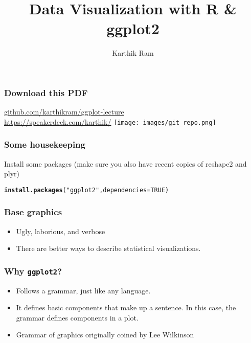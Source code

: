 \documentclass{beamer}\usepackage[]{graphicx}\usepackage[]{color}
\makeatletter
\newcommand{\hlstr}[1]{\textcolor[rgb]{0.192,0.494,0.8}{#1}}%
\newcommand{\hlkwd}[1]{\textcolor[rgb]{0.737,0.353,0.396}{\textbf{#1}}}%
\newenvironment{kframe}{%
 \def\at@end@of@kframe{}%
 \ifinner\ifhmode%
  \def\at@end@of@kframe{\end{minipage}}%
  \begin{minipage}{\columnwidth}%
 \fi\fi%
 \def\FrameCommand##1{\hskip\@totalleftmargin \hskip-\fboxsep
 \colorbox{shadecolor}{##1}\hskip-\fboxsep
     \hskip-\linewidth \hskip-\@totalleftmargin \hskip\columnwidth}%
 \MakeFramed {\advance\hsize-\width
   \@totalleftmargin\z@ \linewidth\hsize
   \@setminipage}}%
 {\par\unskip\endMakeFramed%
 \at@end@of@kframe}
\newenvironment{knitrout}{}{} %
\makeatother
\begin{document}


\title{Data Visualization with R \& ggplot2}
\author{Karthik Ram}
\maketitle

\begin{frame}[fragile]
\frametitle{Download this PDF}
\begingroup
    \fontsize{12pt}{12pt}\selectfont
\href{http://github.com/karthikram/ggplot-lecture}{github.com/karthikram/ggplot-lecture}\\
\href{https://speakerdeck.com/karthik/}{https://speakerdeck.com/karthik/}
\endgroup
\texttt{[image: images/git\_repo.png]}
\end{frame}

\begin{frame}[fragile]
\frametitle{Some housekeeping}
Install some packages (make sure you also have recent copies of reshape2 and plyr)
\begin{knitrout}\footnotesize
{}\color{fgcolor}\begin{kframe}
\begin{alltt}
\hlkwd{install.packages}(\hlstr{"ggplot2"}, dependencies = TRUE)
\end{alltt}
\end{kframe}
\end{knitrout}

\end{frame}



\begin{frame}[fragile]
\frametitle{Base graphics}
\begin{itemize}
\item Ugly, laborious, and verbose\\
\item There are better ways to describe statistical visualizations.\\
\end{itemize}
\end{frame}

\begin{frame}[fragile]
\frametitle{Why \texttt{ggplot2}?}
\begin{itemize}
\item Follows a grammar, just like any language.
\item It defines basic components that make up a sentence. In this case, the grammar defines components in a plot.
\item Grammar of graphics originally coined by Lee Wilkinson
\end{itemize}
\end{frame}
\end{document}
